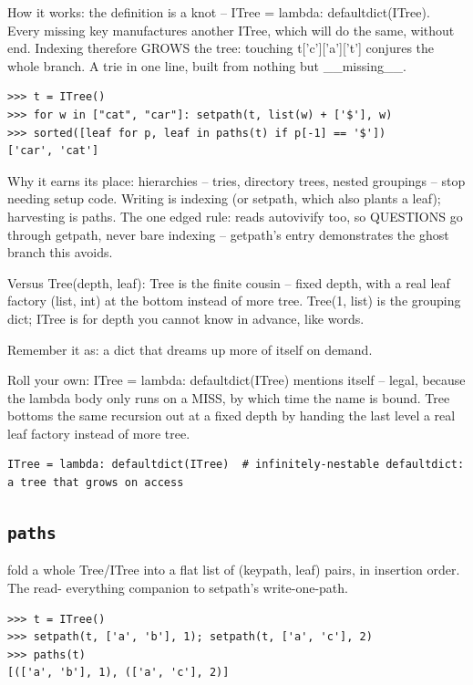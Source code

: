 \documentclass[10pt,letterpaper]{book}
\begin{document}
How it works: the definition is a knot -- ITree = lambda: defaultdict(ITree). Every missing key manufactures another ITree, which will do the same, without end. Indexing therefore GROWS the tree: touching t['c']['a']['t'] conjures the whole branch. A trie in one line, built from nothing but \_\_missing\_\_.

\begin{lstlisting}[style=ex]
>>> t = ITree()
>>> for w in ["cat", "car"]: setpath(t, list(w) + ['$'], w)
>>> sorted([leaf for p, leaf in paths(t) if p[-1] == '$'])
['car', 'cat']
\end{lstlisting}

Why it earns its place: hierarchies -- tries, directory trees, nested groupings -- stop needing setup code. Writing is indexing (or setpath, which also plants a leaf); harvesting is paths. The one edged rule: reads autovivify too, so QUESTIONS go through getpath, never bare indexing -- getpath's entry demonstrates the ghost branch this avoids.


Versus Tree(depth, leaf): Tree is the finite cousin -- fixed depth, with a real leaf factory (list, int) at the bottom instead of more tree. Tree(1, list) is the grouping dict; ITree is for depth you cannot know in advance, like words.


Remember it as: a dict that dreams up more of itself on demand.


Roll your own: ITree = lambda: defaultdict(ITree) mentions itself -- legal, because the lambda body only runs on a MISS, by which time the name is bound. Tree bottoms the same recursion out at a fixed depth by handing the last level a real leaf factory instead of more tree.

\begin{lstlisting}[style=ex]
ITree = lambda: defaultdict(ITree)  # infinitely-nestable defaultdict: a tree that grows on access
\end{lstlisting}

\subsection{\texttt{paths}}\label{def:paths}
fold a whole Tree/ITree into a flat list of (keypath, leaf) pairs, in insertion order. The read- everything companion to setpath's write-one-path.
\begin{lstlisting}[style=ex]
>>> t = ITree()
>>> setpath(t, ['a', 'b'], 1); setpath(t, ['a', 'c'], 2)
>>> paths(t)
[(['a', 'b'], 1), (['a', 'c'], 2)]
\end{lstlisting}
\end{document}

